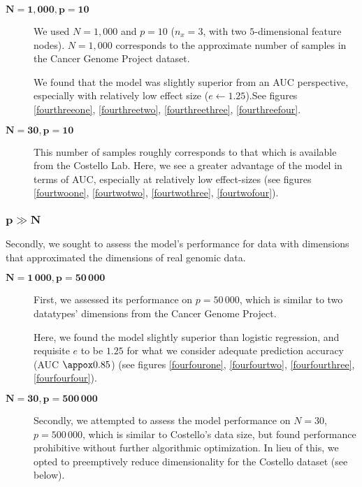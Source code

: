 \begin{description}
\item[$\mathbf{N=1,000, p=10}$] We used $N=1,000$ and $p=10$
  ($n_x = 3$, with two $5$-dimensional feature nodes). $N=1,000$
  corresponds to the approximate number of samples in the Cancer
  Genome Project\cite{ledford_end_2015} dataset.

  We found that the model was slightly superior from an AUC
  perspective, especially with relatively low effect size
  ($e \leftarrow 1.25$).See figures \ref{fourthreeone}, \ref{fourthreetwo}, \ref{fourthreethree}, \ref{fourthreefour}.


  
  \item[$\mathbf{N=30,p=10}$] This number of samples roughly
    corresponds to that which is available from the Costello
    Lab. Here, we see a greater advantage of the model in terms of
    AUC, especially at relatively low effect-sizes (see figures \ref{fourtwoone}, \ref{fourtwotwo}, \ref{fourtwothree}, \ref{fourtwofour}).
    
  \end{description}

\subsubsection{$\mathbf{p \gg N}$}

Secondly, we sought to assess the model's performance for data with dimensions that approximated the dimensions of real genomic data.

\begin{description}
\item[$\mathbf{N = 1\,000, p = 50\,000}$] 

First, we assessed its performance on $p = 50\,000$, which is similar to two datatypes' dimensions from the Cancer Genome Project.

Here, we found the model slightly superior than logistic regression, and requisite $e$ to be $1.25$ for what we consider adequate prediction accuracy (AUC $\appox 0.85$) (see figures \ref{fourfourone}, \ref{fourfourtwo}, \ref{fourfourthree}, \ref{fourfourfour}).




\item[$\mathbf{N = 30, p = 500\,000}$] 
Secondly, we attempted to assess the model performance on  $N = 30$, $p = 500\,000$, which is similar to Costello's data size, but found performance prohibitive without further algorithmic optimization. In lieu of this, we opted to preemptively reduce dimensionality for the Costello dataset (see below).
\end{description}

